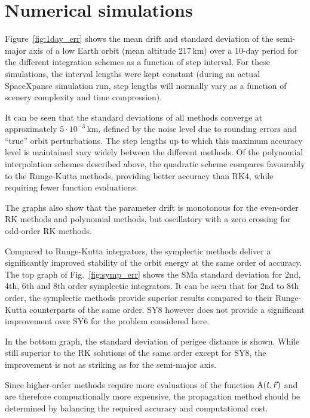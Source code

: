 \documentclass[a4paper]{article}
\begin{document}
\section{Numerical simulations}\label{sec:results}
Figure~\ref{fig:1day_err} shows the mean drift and standard deviation of the semi-major axis of a low Earth orbit (mean altitude 217\,km) over a 10-day period for the different integration schemes as a function of step interval. For these simulations, the interval lengths were kept constant (during an actual SpaceXpanse simulation run, step lengths will normally vary as a function of scenery complexity and time compression).

It can be seen that the standard deviations of all methods converge at approximately $5\cdot 10^{-3}$\,km, defined by the noise level due to rounding errors and ``true'' orbit perturbations. The step lengths up to which this maximum accuracy level is maintained vary widely between the different methods. Of the polynomial interpolation schemes described above, the quadratic scheme compares favourably to the Runge-Kutta methods, providing better accuracy than RK4, while requiring fewer function evaluations.

The graphs also show that the parameter drift is monotonous for the even-order RK methods and polynomial methods, but oscillatory with a zero crossing for odd-order RK methods.

Compared to Runge-Kutta integrators, the symplectic methods deliver a significantly improved stability of the orbit energy at the same order of accuracy. The top graph of Fig.~\ref{fig:symp_err} shows the SMa standard deviation for 2nd, 4th, 6th and 8th order symplectic integrators. It can be seen that for 2nd to 8th order, the symplectic methods provide superior results compared to their Runge-Kutta counterparts of the same order. SY8 however does not provide a significant improvement over SY6 for the problem considered here. 

In the bottom graph, the standard deviation of perigee distance is shown. While still superior to the RK solutions of the same order except for SY8, the improvement is not as striking as for the semi-major axis.

Since higher-order methods require more evaluations of the function $\mathrm{A}(t,\vec{r})$ and are therefore compuationally more expensive, the propagation method should be determined by balancing the required accuracy and computational cost. 
\end{document}
